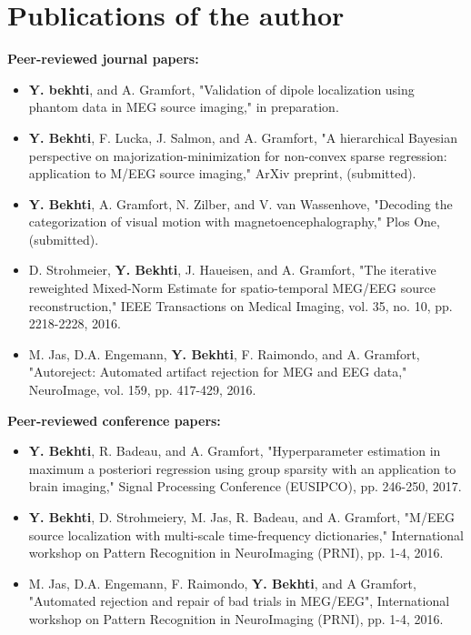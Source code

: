\section*{Publications of the author}
\textbf{Peer-reviewed journal papers:}
\begin{itemize}
\item \textbf{Y. bekhti}, and A. Gramfort, "Validation of dipole localization using phantom data in MEG source imaging," in preparation.
\item \textbf{Y. Bekhti}, F. Lucka, J. Salmon, and A. Gramfort, "A hierarchical Bayesian perspective on majorization-minimization for non-convex sparse regression: application to M/EEG source imaging," ArXiv preprint, (submitted).
\item \textbf{Y. Bekhti}, A. Gramfort, N. Zilber, and V. van Wassenhove, "Decoding the categorization of visual motion with magnetoencephalography," Plos One, (submitted).
\item D. Strohmeier, \textbf{Y. Bekhti}, J. Haueisen, and A. Gramfort, "The iterative reweighted Mixed-Norm Estimate for spatio-temporal MEG/EEG source reconstruction," IEEE Transactions on Medical Imaging, vol. 35, no. 10, pp. 2218-2228, 2016.
\item M. Jas, D.A. Engemann, \textbf{Y. Bekhti}, F. Raimondo, and A. Gramfort, "Autoreject: Automated artifact rejection for MEG and EEG data," NeuroImage, vol. 159, pp. 417-429, 2016.
\end{itemize}

\textbf{Peer-reviewed conference papers:}
\begin{itemize}
\item \textbf{Y. Bekhti}, R. Badeau, and A. Gramfort, "Hyperparameter estimation in maximum a posteriori regression using group sparsity with an application to brain imaging," Signal Processing Conference (EUSIPCO), pp. 246-250, 2017.
\item \textbf{Y. Bekhti}, D. Strohmeiery, M. Jas, R. Badeau, and A. Gramfort, "M/EEG source localization with multi-scale time-frequency dictionaries," International workshop on Pattern Recognition in NeuroImaging (PRNI), pp. 1-4, 2016.
\item M. Jas, D.A. Engemann, F. Raimondo, \textbf{Y. Bekhti}, and A Gramfort, "Automated rejection and repair of bad trials in MEG/EEG", International workshop on Pattern Recognition in NeuroImaging (PRNI), pp. 1-4, 2016.
\end{itemize}
